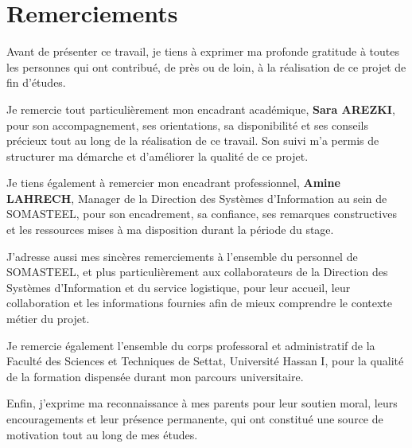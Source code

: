 \chapter*{Remerciements}
{}

Avant de présenter ce travail, je tiens à exprimer ma profonde gratitude à toutes les personnes qui ont contribué, de près ou de loin, à la réalisation de ce projet de fin d'études.

Je remercie tout particulièrement mon encadrant académique, \textbf{Sara AREZKI}, pour son accompagnement, ses orientations, sa disponibilité et ses conseils précieux tout au long de la réalisation de ce travail. Son suivi m'a permis de structurer ma démarche et d'améliorer la qualité de ce projet.

Je tiens également à remercier mon encadrant professionnel, \textbf{Amine LAHRECH}, Manager de la Direction des Systèmes d'Information au sein de SOMASTEEL, pour son encadrement, sa confiance, ses remarques constructives et les ressources mises à ma disposition durant la période du stage.

J'adresse aussi mes sincères remerciements à l'ensemble du personnel de SOMASTEEL, et plus particulièrement aux collaborateurs de la Direction des Systèmes d'Information et du service logistique, pour leur accueil, leur collaboration et les informations fournies afin de mieux comprendre le contexte métier du projet.

Je remercie également l'ensemble du corps professoral et administratif de la Faculté des Sciences et Techniques de Settat, Université Hassan I, pour la qualité de la formation dispensée durant mon parcours universitaire.

Enfin, j'exprime ma reconnaissance à mes parents pour leur soutien moral, leurs encouragements et leur présence permanente, qui ont constitué une source de motivation tout au long de mes études.
